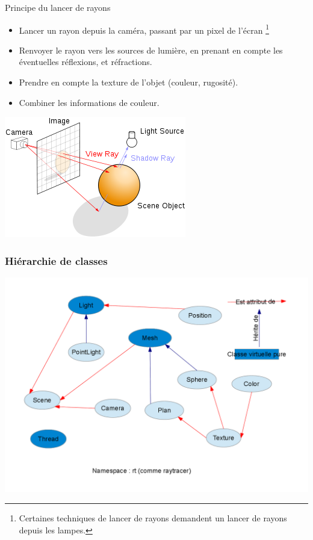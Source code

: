 \begin{frame}{Principe du lancer de rayons}

\begin{itemize}
\item Lancer un rayon depuis la caméra, passant par un pixel de l'écran \footnote{Certaines techniques de lancer de rayons demandent un lancer de rayons depuis les lampes.}
\item Renvoyer le rayon vers les sources de lumière, en prenant en compte les éventuelles réflexions, et réfractions.
\item Prendre en compte la texture de l'objet (couleur, rugosité).
\item Combiner les informations de couleur.
\end{itemize}

\begin{center}
\includegraphics[scale=0.5]{raytracing.png}
\end{center}
\end{frame}



\begin{frame}
\frametitle{Hiérarchie de classes}

\begin{center}
\includegraphics[scale=0.3]{hierarchie.png}
\end{center}

\end{frame}


